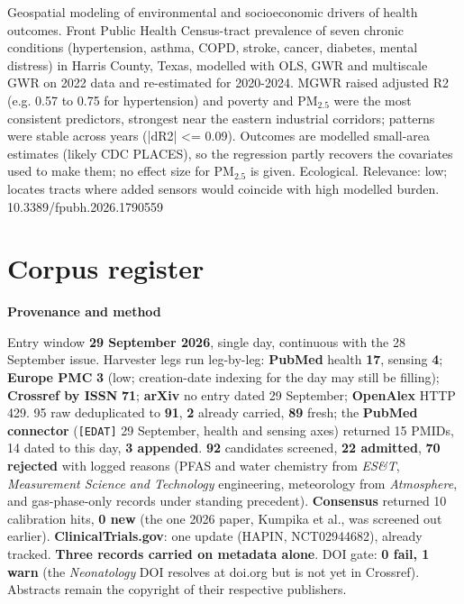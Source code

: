 \documentclass[10pt]{article}
\begin{document}
{Geospatial modeling of environmental and socioeconomic drivers of health outcomes.}
{Front Public Health}
{Census-tract prevalence of seven chronic conditions (hypertension, asthma, COPD, stroke, cancer, diabetes, mental distress) in Harris County, Texas, modelled with OLS, GWR and multiscale GWR on 2022 data and re-estimated for 2020-2024. MGWR raised adjusted R2 (e.g. 0.57 to 0.75 for hypertension) and poverty and PM$_{2.5}$ were the most consistent predictors, strongest near the eastern industrial corridors; patterns were stable across years (|dR2| <= 0.09). Outcomes are modelled small-area estimates (likely CDC PLACES), so the regression partly recovers the covariates used to make them; no effect size for PM$_{2.5}$ is given. Ecological. Relevance: low; locates tracts where added sensors would coincide with high modelled burden.}
{10.3389/fpubh.2026.1790559}

\clearpage
\section*{\sffamily\bfseries\color{Deep}Corpus register}
\vspace{-1.5mm}{\color{Amber}\rule{\linewidth}{1.1pt}}\vspace{2.5mm}



\vspace{2mm}

\begin{keybox}
{\sffamily\bfseries\footnotesize\color{Deep}Provenance and method}\\[1.2mm]
{\fontsize{7.2}{8.8}\selectfont
Entry window \textbf{29 September 2026}, single day, continuous with the 28 September issue.
Harvester legs run leg-by-leg: \textbf{PubMed} health \textbf{17}, sensing \textbf{4}; \textbf{Europe PMC}
\textbf{3} (low; creation-date indexing for the day may still be filling); \textbf{Crossref by ISSN}
\textbf{71}; \textbf{arXiv} no entry dated 29 September; \textbf{OpenAlex} HTTP 429. 95 raw deduplicated to
\textbf{91}, \textbf{2} already carried, \textbf{89} fresh; the \textbf{PubMed connector} (\texttt{[EDAT]}
29 September, health and sensing axes) returned 15 PMIDs, 14 dated to this day, \textbf{3 appended}.
\textbf{92} candidates screened, \textbf{22 admitted}, \textbf{70 rejected} with logged reasons (PFAS and
water chemistry from \textit{ES\&T}, \textit{Measurement Science and Technology} engineering,
meteorology from \textit{Atmosphere}, and gas-phase-only records under standing precedent).
\textbf{Consensus} returned 10 calibration hits, \textbf{0 new} (the one 2026 paper, Kumpika et al., was
screened out earlier). \textbf{ClinicalTrials.gov}: one update (HAPIN, NCT02944682), already tracked.
\textbf{Three records carried on metadata alone}. DOI gate: \textbf{0 fail, 1 warn} (the
\textit{Neonatology} DOI resolves at doi.org but is not yet in Crossref). Abstracts remain the
copyright of their respective publishers.\par}
\end{keybox}
\end{document}
